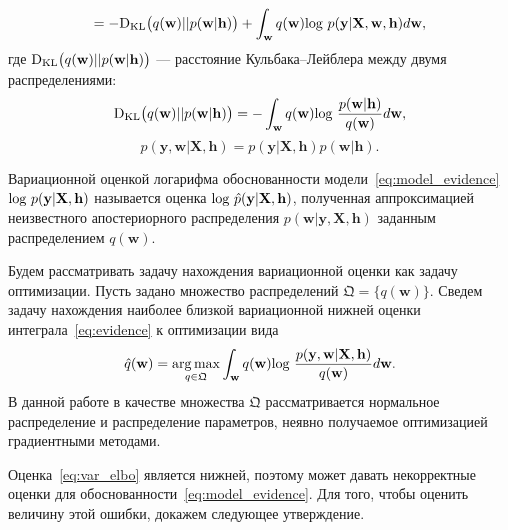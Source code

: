 $$
= -\textnormal{D}_\textnormal{KL} \bigl(q(\mathbf{w})||p(\mathbf{w}|\mathbf{h})\bigr) + \int_{\mathbf{w}} q(\mathbf{w})\textnormal{log}~{p(\mathbf{y}|\mathbf{X},\mathbf{w},\mathbf{h})} d \mathbf{w},
$$
где $\textnormal{D}_\textnormal{KL}\bigl(q(\mathbf{w})||p(\mathbf{w} |\mathbf{h})\bigr)$ --- расстояние Кульбака--Лейблера между двумя распределениями: $$\textnormal{D}_\textnormal{KL}\bigl(q(\mathbf{w})||p(\mathbf{w} |\mathbf{h})\bigr) = -\int_{\mathbf{w}} q(\mathbf{w})\textnormal{log}~\frac{p(\mathbf{w} | \mathbf{h})}{q(\mathbf{w})}d\mathbf{w},$$
$$
p(\mathbf{y},\mathbf{w}|\mathbf{X},\mathbf{h}) = p(\mathbf{y}|\mathbf{X},\mathbf{h})p(\mathbf{w}|\mathbf{h}).
$$

{
\begin{defin} Вариационной оценкой логарифма обоснованности модели~\eqref{eq:model_evidence} $\textnormal{log}~p(\mathbf{y}|\mathbf{X},\mathbf{h})$ называется оценка $\textnormal{log}~\hat{p}(\mathbf{y}|\mathbf{X},\mathbf{h})$, полученная аппроксимацией неизвестного апостериорного распределения $p(\mathbf{w}| \mathbf{y}, \mathbf{X}, \mathbf{h})$ заданным распределением $q(\mathbf{w})$.
\end{defin}
}


Будем рассматривать задачу нахождения вариационной оценки как задачу оптимизации. Пусть задано множество распределений $\mathfrak{Q} =\{q(\mathbf{w})\}$. Сведем задачу нахождения наиболее близкой вариационной нижней оценки интеграла~\eqref{eq:evidence} к оптимизации вида
\[
     \hat{q}(\mathbf{w}) = \operatorname*{arg\,max}_{q \in \mathfrak{Q}}  \int_{\mathbf{w}} q(\mathbf{w})\textnormal{log}~\frac{p(\mathbf{y},\mathbf{w}|\mathbf{X},\mathbf{h})}{q(\mathbf{w})}d\mathbf{w}.
\]  
В данной работе в качестве множества $\mathfrak{Q}$ рассматривается нормальное распределение и распределение параметров, неявно получаемое оптимизацией градиентными методами. 

Оценка~\eqref{eq:var_elbo} является нижней, поэтому может давать некорректные оценки для обоснованности~\eqref{eq:model_evidence}. Для того, чтобы оценить величину этой ошибки, докажем следующее утверждение.

